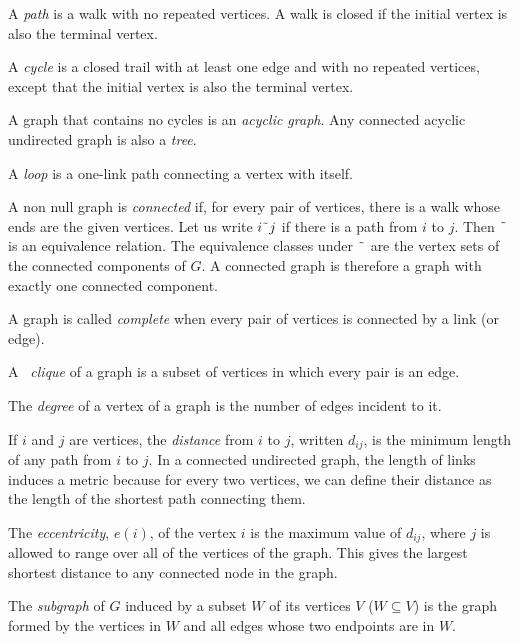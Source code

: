 \documentclass[justified, sixbynine]{tufte-book}
\theoremstyle{plain}%
\newtheorem * {corollary}{Corollary}
\theoremstyle{definition}
\theoremstyle{remark}
\newtheorem * {remark}{Remark}
\newtheorem * {note}{Note}
\begin{document}
\begin{fullwidth}
A {\it path} is a walk with no repeated vertices. A walk is closed if the
initial vertex is also the terminal vertex.

A {\it cycle} is a closed trail with at least one edge and with no repeated
vertices, except that the initial vertex is also the terminal vertex.

A graph that contains no cycles is an {\it acyclic graph}. Any connected
acyclic undirected graph is also a {\it tree}.


A {\it loop} is a one-link path connecting a vertex with itself.


A non null graph is {\it connected} if, for every pair of vertices, there is
a walk whose ends are the given vertices. Let us write $i%
\symbol{126}j$ if there is a path from $i$ to $j$. Then $\symbol{126}$ is an
equivalence relation. The equivalence classes under $\symbol{126}$ are the
vertex sets of the connected components of $G$. A connected graph is therefore
a graph with exactly one connected component.


A graph is called {\it complete} when every pair of vertices is connected by
a link (or edge).


A {\it \ clique } of a graph is a subset of vertices in which every pair is an
edge.


The {\it degree} of a vertex of a graph is the number of edges incident to
it.

If $i$ and $j$ are vertices, the {\it distance} from $i$ to $j$, written $%
d_{ij}$, is the minimum length of any path from $i$ to $j$. In a connected
undirected graph, the length of links induces a metric because for every two vertices, we can define their distance as the length of the shortest path connecting them.

The {\it eccentricity}, $e(i)$, of the vertex $i$ is the maximum value of $%
d_{ij}$, where $j$ is allowed to range over all of the vertices of the graph.  This gives the largest shortest distance to any connected node in the graph.

The {\it subgraph} of $G$ induced by a subset $W$ of its vertices $V$ ($%
W\subseteq V$) is the graph formed by the vertices in $W$ and all edges
whose two endpoints are in $W$.


\end{fullwidth}
\end{document}

